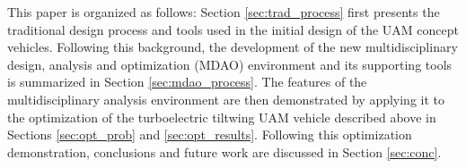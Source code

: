 This paper is organized as follows:
Section \ref{sec:trad_process} first presents the traditional design process and tools used in the initial design of the UAM concept vehicles.
Following this background, the development of the new multidisciplinary design, analysis and optimization (MDAO) environment and its supporting tools is summarized in Section \ref{sec:mdao_process}.
The features of the multidisciplinary analysis environment are then demonstrated by applying it to the optimization of the turboelectric tiltwing UAM vehicle described above in Sections \ref{sec:opt_prob} and \ref{sec:opt_results}.
Following this optimization demonstration, conclusions and future work are discussed in Section \ref{sec:conc}. 


